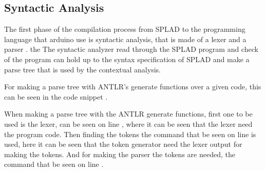 \subsection{Syntactic Analysis}
The first phase of the compilation process from SPLAD to the programming language that arduino use is syntactic analysis, that is made of a lexer  and a parser . the The syntactic analyzer read through the SPLAD program and check of the program can hold up to the syntax specification of SPLAD and make a parse tree that is used by the contextual analysis.

For making a parse tree with ANTLR's generate functions over a given code, this can be seen in the code snippet .

When making a parse tree with the ANTLR generate functions, first one to be used is the lexer, can be seen on line , where it can be seen that the lexer need the program code. Then finding the tokens the command that be seen on line  is used, here it can be seen that the token generator need the lexer output for making the tokens. And for making the parser the tokens are needed, the command that be seen on line .